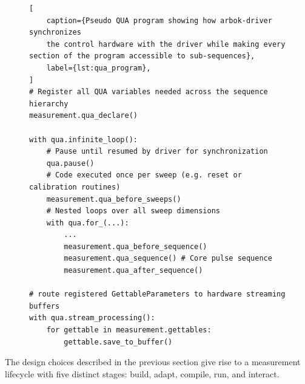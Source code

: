 \documentclass[numbers, preprint, twocolumn,10pt]{elsarticle}
\begin{document}
\begin{figure}[t]
\begin{lstlisting}[
    caption={Pseudo QUA program showing how arbok-driver synchronizes 
    the control hardware with the driver while making every section of the program accessible to sub-sequences},
    label={lst:qua_program},
]
# Register all QUA variables needed across the sequence hierarchy
measurement.qua_declare()

with qua.infinite_loop():
    # Pause until resumed by driver for synchronization
    qua.pause()
    # Code executed once per sweep (e.g. reset or calibration routines)
    measurement.qua_before_sweeps()
    # Nested loops over all sweep dimensions
    with qua.for_(...):
        ...
        measurement.qua_before_sequence()
        measurement.qua_sequence() # Core pulse sequence
        measurement.qua_after_sequence()

# route registered GettableParameters to hardware streaming buffers
with qua.stream_processing():
    for gettable in measurement.gettables:
        gettable.save_to_buffer()
\end{lstlisting}
\end{figure}

\noindent
The design choices described in the previous section give rise to a measurement lifecycle with five distinct stages: build, adapt, compile, run, and interact.
\end{document}
